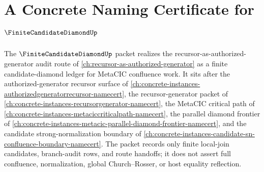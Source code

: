 \chapter{A Concrete Naming Certificate for $\FiniteCandidateDiamondUp$}
\label{ch:concrete-instances-finite-candidate-diamond-namecert}

The $\FiniteCandidateDiamondUp$ packet realizes the recursor-as-authorized-generator audit route of \autoref{ch:recursor-as-authorized-generator} as a finite candidate-diamond ledger for MetaCIC confluence work. It sits after the authorized-generator recursor surface of \autoref{ch:concrete-instances-authorizedgeneratorrecursor-namecert}, the recursor-generator packet of \autoref{ch:concrete-instances-recursorgenerator-namecert}, the MetaCIC critical path of \autoref{ch:concrete-instances-metaciccriticalpath-namecert}, the parallel diamond frontier of \autoref{ch:concrete-instances-metacic-parallel-diamond-frontier-namecert}, and the candidate strong-normalization boundary of \autoref{ch:concrete-instances-candidate-sn-confluence-boundary-namecert}. The packet records only finite local-join candidates, branch-audit rows, and route handoffs; it does not assert full confluence, normalization, global Church--Rosser, or host equality reflection.

